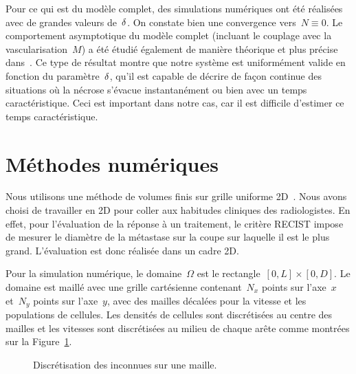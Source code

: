 \documentclass[main.tex]{subfiles}
\begin{document}
Pour ce qui est du modèle complet, des simulations numériques ont été réalisées avec de grandes valeurs de~$\delta$. On constate bien une convergence vers~$N\equiv0$. 
Le comportement asymptotique du modèle complet (incluant le couplage avec la vascularisation~$M$) a été étudié également de manière théorique et plus précise  
dans~\cite{michel:hal-01211770}. Ce type de résultat montre que notre système est uniformément valide en fonction du paramètre~$\delta$, \cad qu'il est capable de décrire de façon continue des situations où la nécrose s'évacue instantanément ou bien avec un temps caractéristique. Ceci est important dans notre cas, car il est difficile d'estimer ce temps caractéristique.

\section{Méthodes numériques}\label{sec:NumMet}

Nous utilisons une méthode de volumes finis sur grille uniforme 2D~\cite{eymard2000finite}. 
Nous avons choisi de travailler en 2D pour coller aux habitudes cliniques des radiologistes. En effet, pour l'évaluation de la réponse à un traitement, le critère RECIST impose de mesurer le diamètre de la métastase sur la coupe sur laquelle il est le plus grand. L'évaluation est donc réalisée dans un cadre 2D.


Pour la simulation numérique, le domaine~$\Omega$ est le 
rectangle~$[0,L]\times[0,D]$. Le domaine est maillé avec une grille cartésienne contenant~$N_x$ points sur l'axe~$x$ et~$N_y$ points sur l'axe~$y$, avec des mailles décalées pour la vitesse et les populations de cellules. 
Les densités de cellules sont discrétisées au centre des mailles et les vitesses sont discrétisées au milieu de chaque arête comme montrées sur la Figure~\ref{fig:place_inconnues}.

\begin{figure}[h]
\centering

\caption{Discrétisation des inconnues sur une maille.\label{fig:place_inconnues}}
\end{figure}
\end{document}
